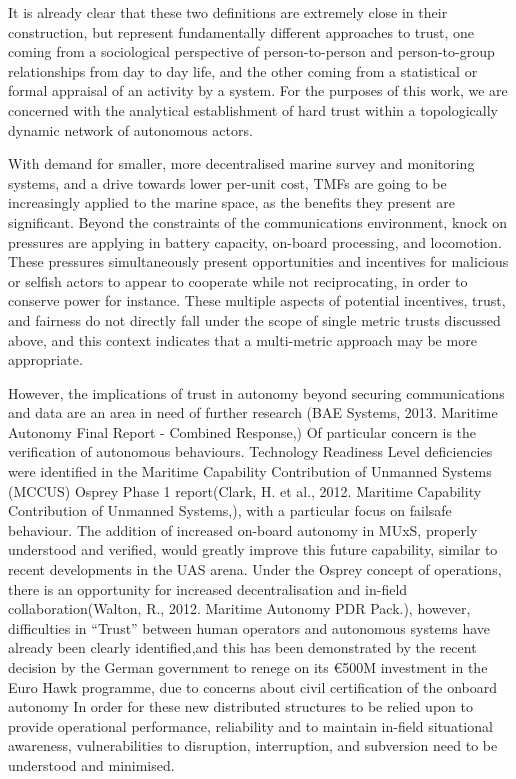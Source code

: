 It is already clear that these two definitions are extremely close in their construction, but represent fundamentally different approaches to trust, one coming from a sociological perspective of person-to-person and person-to-group relationships from day to day life, and the other coming from a statistical or formal appraisal of an activity by a system.
For the purposes of this work, we are concerned with the analytical establishment of hard trust within a topologically dynamic network of autonomous actors.


With demand for smaller, more decentralised marine survey and monitoring systems, and a drive towards lower per-unit cost, TMFs are going to be increasingly applied to the marine space, as the benefits they present are significant.
Beyond the constraints of the communications environment, knock on pressures are applying in battery capacity, on-board processing, and locomotion.
These pressures simultaneously present opportunities and incentives for malicious or selfish actors to appear to cooperate while not reciprocating, in order to conserve power for instance.
These multiple aspects of potential incentives, trust, and fairness do not directly fall under the scope of single metric trusts discussed above, and this context indicates that a multi-metric approach may be more appropriate.

However, the implications of trust in autonomy beyond securing communications and data are an area in need of further research (BAE Systems, 2013. Maritime Autonomy Final Report - Combined Response,)
Of particular concern is the verification of autonomous behaviours.
Technology Readiness Level deficiencies were identified in the Maritime Capability Contribution of Unmanned Systems (MCCUS) Osprey Phase 1 report(Clark, H. et al., 2012. Maritime Capability Contribution of Unmanned Systems,), with a particular focus on failsafe behaviour. 
The addition of increased on-board autonomy in MUxS, properly understood and verified, would greatly improve this future capability, similar to recent developments in the UAS arena\cite{Cummings2010}.
Under the Osprey concept of operations, there is an opportunity for increased decentralisation and in-field collaboration(Walton, R., 2012. Maritime Autonomy PDR Pack.), however, difficulties in “Trust” between human operators and autonomous systems have already been clearly identified\cite{Chen2011b},and this has been demonstrated by the recent decision by the German government to renege on its €500M investment in the Euro Hawk programme, due to concerns about civil certification of the onboard autonomy\cite{Mehta2013}
In order for these new distributed structures to be relied upon to provide operational performance, reliability and to maintain in-field situational awareness, vulnerabilities to disruption, interruption, and subversion need to be understood and minimised.

